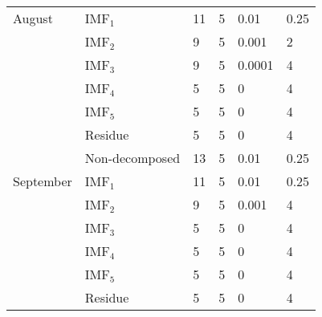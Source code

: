 \begin{scriptsize}
\begin{center}
\begin{longtable}[htb!]{llllll}
August     & IMF$_1$                    & 11                               & 5                                 & 0.01                                      & 0.25 \\
           & IMF$_2$                    & 9                                & 5                                 & 0.001                                     & 2 \\
           & IMF$_3$                    & 9                                & 5                                 & 0.0001                                    & 4 \\
           & IMF$_4$                    & 5                                & 5                                 & 0                                         & 4 \\
           & IMF$_5$                    & 5                                & 5                                 & 0                                         & 4 \\
           & Residue                    & 5                                & 5                                 & 0                                         & 4 \\
           & Non-decomposed             & 13                               & 5                                 & 0.01                                      & 0.25 \\ \hline
September  & IMF$_1$                    & 11                               & 5                                 & 0.01                                      & 0.25 \\
           & IMF$_2$                    & 9                                & 5                                 & 0.001                                     & 4 \\
           & IMF$_3$                    & 5                                & 5                                 & 0                                         & 4 \\
           & IMF$_4$                    & 5                                & 5                                 & 0                                         & 4 \\
           & IMF$_5$                    & 5                                & 5                                 & 0                                         & 4 \\
           & Residue                    & 5                                & 5                                 & 0                                         & 4 \\

\end{longtable}
\end{center}
\end{scriptsize}
